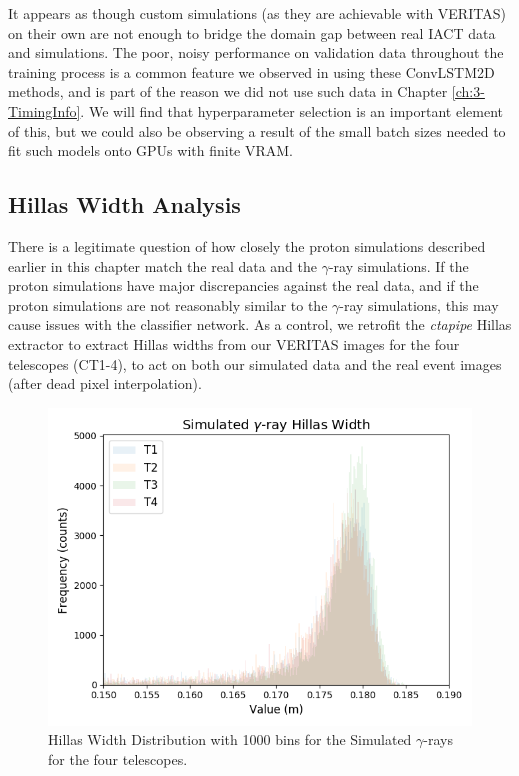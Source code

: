 It appears as though custom simulations (as they are achievable with VERITAS) on their own are not enough to bridge the domain gap between real IACT data and simulations. The poor, noisy performance on validation data throughout the training process is a common feature we observed in using these ConvLSTM2D methods, and is part of the reason we did not use such data in Chapter \ref{ch:3-TimingInfo}. We will find that hyperparameter selection is an important element of this, but we could also be observing a result of the small batch sizes needed to fit such models onto GPUs with finite VRAM.

\subsection{Hillas Width Analysis}
There is a legitimate question of how closely the proton simulations described earlier in this chapter match the real data and the $\gamma$-ray simulations. If the proton simulations have major discrepancies against the real data, and if the proton simulations are not reasonably similar to the $\gamma$-ray simulations, this may cause issues with the classifier network. As a control, we retrofit the \textit{ctapipe} Hillas extractor to extract Hillas widths from our VERITAS images for the four telescopes (CT1-4), to act on both our simulated data and the real event images (after dead pixel interpolation).
\begin{figure}[ht] 
        \centering \includegraphics[width=\columnwidth]{figures/Gamma2_int.png}

        \caption{
                \label{fig:Gamma2_int} Hillas Width Distribution with 1000 bins for the Simulated $\gamma$-rays for the four telescopes.
        }
\end{figure}
